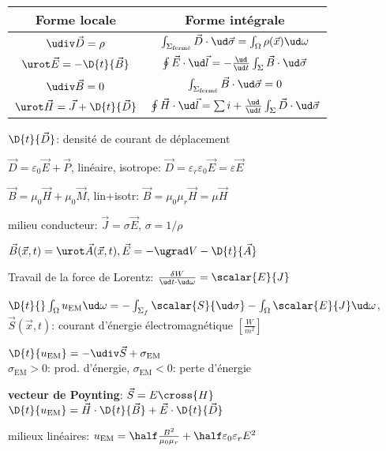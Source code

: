   \begin{tabular}{|@{\ }c@{\ }|@{\ }c@{\ }|}
   \hline
   \textbf{Forme locale} & \textbf{Forme intégrale} \\
   \hline \hline
   $\udiv \vec D = \rho$ & $\int_{\Sigma_{\textrm{fermé}}} \vec D \cdot
   \ud \vec \sigma = \int_\Omega \rho(\vec x) \ud \omega$ \\
   \hline
   $\urot \vec E = -\D{t}{\vec B}$ & $\oint \vec E \cdot \ud \vec l = -
   \frac{\ud}{\ud t} \int_\Sigma \vec B \cdot \ud \vec \sigma$ \\
   \hline
   $\udiv \vec B = 0$ & $\int_{\Sigma_{\textrm{fermé}}} \vec B \cdot
   \ud \vec \sigma = 0$ \\
   \hline
   $\urot \vec H = \vec J + \D{t}{\vec D}$ & $\oint \vec H \cdot \ud
   \vec l = \sum i + \frac{\ud}{\ud t} \int_\Sigma \vec D \cdot \ud
   \vec \sigma$ \\
   \hline
  \end{tabular}

  \squishlist
   \item $\D{t}{\vec D}$: densité de courant de déplacement
   \item $\vec D = \varepsilon_0 \vec E + \vec P$, 
         linéaire, isotrope: $\vec D = \varepsilon_r \varepsilon_0 \vec E = \varepsilon \vec E$
   \item $\vec B = \mu_0 \vec H + \mu_0 \vec M$, 
         lin+isotr: $\vec B = \mu_0 \mu_r \vec H = \mu \vec H$
   \item milieu conducteur: $\vec J = \sigma \vec E$, $\sigma = 1/\rho$ 
   \item $\vec B (\vec x, t) = \urot \vec A(\vec x,t), \vec E = - \ugrad V - \D{t}{\vec A}$
  \squishend

  \squishlist
   \item Travail de la force de Lorentz: $\frac{\delta W}{\ud t \cdot \ud \omega} = \scalar{E}{J}$
   \item $\D{t}{} \int_\Omega u_\textrm{EM} \ud \omega = - \int_{\Sigma_f} \scalar{S}{\ud \sigma}
           - \int_\Omega \scalar{E}{J} \ud \omega$, \\
         $\vec S (\vec x,t)$: courant d'énergie électromagnétique $[\frac{W}{m^2}]$
   \item $\D{t}{u_\textrm{EM}} = - \udiv \vec S + \sigma_\textrm{EM}$ \\
         $\sigma_\textrm{EM} > 0$: prod. d'énergie, $\sigma_\textrm{EM} < 0$: perte d'énergie
   \item \textbf{vecteur de Poynting}: $\vec S = {E}\cross{H}$ \\
         $\D{t}{u_\textrm{EM}} = \vec H \cdot \D{t}{\vec B} + \vec E \cdot \D{t}{\vec D}$
   \item milieux linéaires: $u_\textrm{EM} = \half \frac{B^2}{\mu_0 \mu_r} + \half \varepsilon_0 \varepsilon_r E^2$
  \squishend